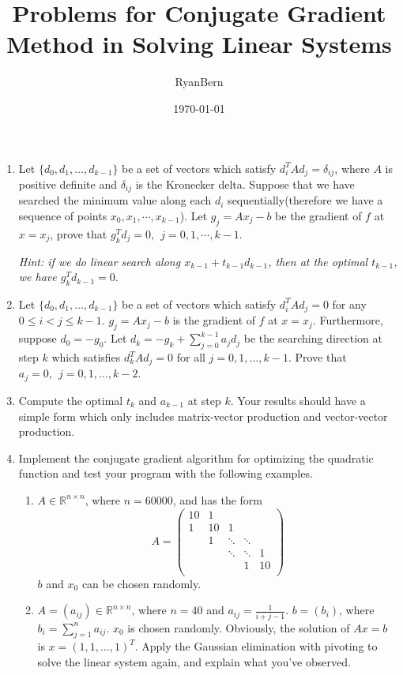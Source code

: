 \documentclass[a4paper]{article}
\title{Problems for Conjugate Gradient Method in Solving Linear Systems}
\author{RyanBern}
\date{\today}
\begin{document}
\maketitle
\begin{enumerate}
\item Let $\{d_0, d_1, \ldots, d_{k-1}\}$ be a set of vectors which satisfy
$d_i^TAd_j=\delta_{ij}$, where $A$ is positive definite and $\delta_{ij}$ is
the Kronecker delta. Suppose that we have searched the minimum value along
each $d_i$ sequentially(therefore we have a sequence of points $x_0, x_1, \cdots, x_{k-1}$).
Let $g_j=Ax_j-b$ be the gradient of $f$ at $x=x_j$, prove that $g_k^Td_j=0,~~j=0,1,\cdots,k-1$.

\emph{Hint: if we do linear search along $x_{k-1}+t_{k-1}d_{k-1}$, then at the optimal $t_{k-1}$, we have
$g_{k}^Td_{k-1}=0$}.
\item Let $\{d_0, d_1, \ldots, d_{k-1}\}$ be a set of vectors which satisfy
$d_i^TAd_j=0$ for any $0\leqslant i<j\leqslant k-1$. $g_j=Ax_j-b$ is the gradient of $f$ at $x=x_j$. Furthermore, suppose
$d_0=-g_0$. Let $d_k=-g_k+\sum_{j=0}^{k-1}a_jd_j$ be the searching direction at step $k$
which satisfies $d_k^TAd_j=0$ for all $j=0,1,\ldots,k-1$. Prove that $a_j=0,~~j=0,1,\ldots,k-2$.

\item Compute the optimal $t_k$ and $a_{k-1}$ at step $k$. Your results should have
a simple form which only includes matrix-vector production and vector-vector production.

\item Implement the conjugate gradient algorithm for optimizing the quadratic function and
test your program with the following examples.
\begin{enumerate}
\item $A\in \mathbb{R}^{n\times n}$, where $n=60000$, and has the form
\[
A=\left(\begin{array}{ccccc}
10 & 1 &&&\\
1 & 10 & 1 &&\\
&1&\ddots&\ddots &\\
&&\ddots&\ddots& 1\\
&&& 1 & 10\\
\end{array}
\right)
\]
$b$ and $x_0$ can be chosen randomly.
\item $A=(a_{ij})\in \mathbb{R}^{n\times n}$, where $n=40$ and $a_{ij}=\frac{1}{i+j-1}$.
$b=(b_i)$, where $b_i=\sum_{j=1}^{n}a_{ij}$. $x_0$ is chosen randomly. Obviously, the
solution of $Ax=b$ is $x=(1,1,\ldots,1)^T$. Apply the Gaussian elimination with pivoting
to solve the linear system again, and explain what you've observed.
\end{enumerate}

\end{enumerate}
\end{document}
